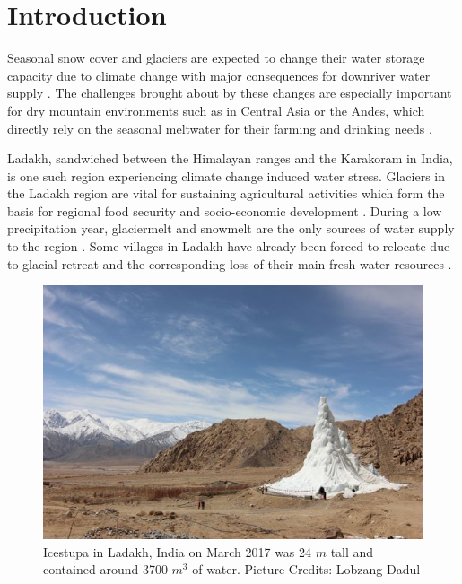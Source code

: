 \documentclass[utf8]{frontiersSCNS}
\begin{document}
\section{Introduction}

Seasonal snow cover and glaciers are expected to change their water storage capacity due to climate
change with major consequences for downriver water supply \citep{Immerzeel_2020}. The challenges brought about
by these changes are especially important for dry mountain environments such as in Central Asia or the Andes,
which directly rely on the seasonal meltwater for their farming and drinking needs \citep{HoelzleBarandun_2019,
	Apel_2018, Buytaert_2017, Chen_2016, UNGERSHAYESTEH_2013}.

Ladakh, sandwiched between the Himalayan ranges and the Karakoram in India, is one such region experiencing climate
change induced water stress. Glaciers in the Ladakh region are vital for sustaining agricultural activities which
form the basis for regional food security and socio-economic development \citep{Labbal_2000, Schmidt_2012}.
During a low precipitation year, glaciermelt and snowmelt are the only sources of water supply to the region
\citep{Thayyen_2010}. Some villages in Ladakh have already been forced to relocate due to glacial retreat
and the corresponding loss of their main fresh water resources \citep{zanskar}.

\begin{figure}
	\begin{center}
		\includegraphics[width=10 cm]{Figures/Figure_1.jpg}
	\end{center}
	\caption{Icestupa in Ladakh, India on March 2017 was 24 $m$ tall and contained around 3700 $m^3$
		of water. Picture Credits: Lobzang Dadul}
	\label{fig:old_icestupa}
\end{figure}
\end{document}
